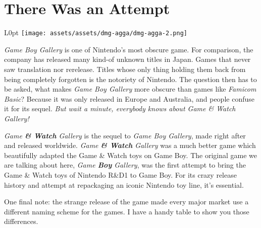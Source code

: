 \documentclass{book}
\let\oldcenter\center
\let\oldendcenter\endcenter
\renewenvironment{center}{\setlength\topsep{0pt}\oldcenter}{\oldendcenter}
\begin{document}
\newpage\FloatBarrier\needspace{10mm}\section*{There Was an Attempt}\nopagebreak[4]
\begin{wrapfigure}{L}{0pt} \texttt{[image: assets/assets/dmg-agga/dmg-agga-2.png]}\end{wrapfigure}
\emph{Game Boy Gallery} is one of Nintendo’s most obscure game. For comparison, the company has released many kind-of unknown titles in Japan. Games that never saw translation nor rerelease. Titles whose only thing holding them back from being completely forgotten is the notoriety of Nintendo. The question then has to be asked, what makes \emph{Game Boy Gallery} more obscure than games like \emph{Famicom Basic}? Because it was only released in Europe and Australia, and people confuse it for its sequel. \emph{But wait a minute, everybody knows about Game \& Watch Gallery!}

\begin{center}
\quad\vspace{4pt}
\quad\vspace{4pt}
\end{center}

\emph{Game \textbf{\& Watch} Gallery} is the sequel to \emph{Game Boy Gallery}, made right after and released worldwide. \emph{Game \textbf{\& Watch} Gallery} was a much better game which beautifully adapted the Game \& Watch toys on Game Boy. The original game we are talking about here, \emph{Game \textbf{Boy} Gallery}, was the first attempt to bring the Game \& Watch toys of Nintendo R\&D1 to Game Boy. For its crazy release history and attempt at repackaging an iconic Nintendo toy line, it’s essential.

One final note: the strange release of the game made every major market use a different naming scheme for the games. I have a handy table to show you those differences.
\end{document}
